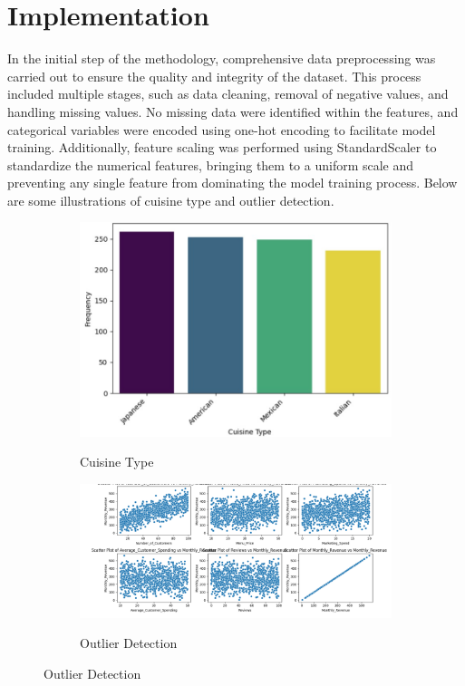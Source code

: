 \documentclass{josis}
\begin{document}
\section{Implementation}
In the initial step of the methodology, comprehensive data preprocessing was carried out to ensure the quality and integrity of the dataset. This process included multiple stages, such as data cleaning, removal of negative values, and handling missing values. No missing data were identified within the features, and categorical variables were encoded using one-hot encoding to facilitate model training. Additionally, feature scaling was performed using StandardScaler to standardize the numerical features, bringing them to a uniform scale and preventing any single feature from dominating the model training process. Below are some illustrations of cuisine type and outlier detection.

\begin{figure}[t]
    \centering
    \begin{subfigure}[b]{0.65\textwidth}
        \centering
        \caption{Cuisine Type}
        \includegraphics[width=\textwidth]{cuisinetype.jpg}
        \label{fig:subfig1}
    \end{subfigure}
    \centering
    \begin{subfigure}[b]{0.95\textwidth}
        \centering
        \caption{Outlier Detection}
        \includegraphics[width=\textwidth]{outlier.png}
        \label{fig:subfig2}
    \end{subfigure}
    \hfill
\end{figure}
\end{document}

